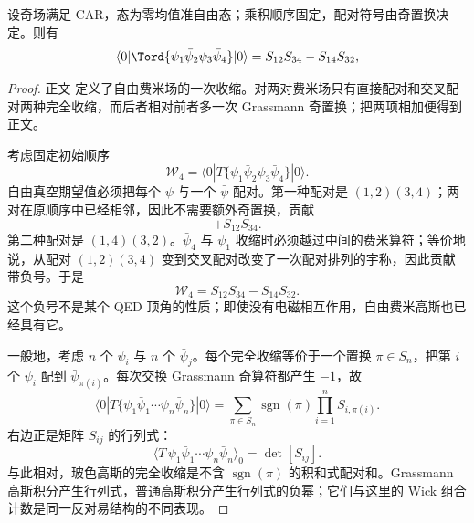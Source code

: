 \begin{proposition}[费米高斯态的四点配对]
设奇场满足 CAR，态为零均值准自由态；乘积顺序固定，配对符号由奇置换决定。则有
\begin{equation}
 {
 \langle0|\Tord\{\psi_1\bar\psi_2\psi_3\bar\psi_4\}|0\rangle
 =S_{12}S_{34}-S_{14}S_{32},}
\label{eq:fermion-wick-four-r68}
\end{equation}
\end{proposition}
\begin{proof}
正文 定义了自由费米场的一次收缩。对两对费米场只有直接配对和交叉配对两种完全收缩，而后者相对前者多一次 Grassmann 奇置换；把两项相加便得到正文。



考虑固定初始顺序
\begin{equation*}
 \mathscr W_4
 =\langle0|T\{\psi_1\bar\psi_2\psi_3\bar\psi_4\}|0\rangle.
\end{equation*}
自由真空期望值必须把每个 $\psi$ 与一个 $\bar\psi$ 配对。第一种配对是 $(1,2)(3,4)$；两对在原顺序中已经相邻，因此不需要额外奇置换，贡献
\begin{equation*}
 +S_{12}S_{34}.
\end{equation*}
第二种配对是 $(1,4)(3,2)$。$\bar\psi_4$ 与 $\psi_1$ 收缩时必须越过中间的费米算符；等价地说，从配对 $(1,2)(3,4)$ 变到交叉配对改变了一次配对排列的宇称，因此贡献带负号。于是
\begin{equation*}
 {
 \mathscr W_4=S_{12}S_{34}-S_{14}S_{32}.}
 \end{equation*}
这个负号不是某个 QED 顶角的性质；即使没有电磁相互作用，自由费米高斯也已经具有它。

一般地，考虑 $n$ 个 $\psi_i$ 与 $n$ 个 $\bar\psi_j$。每个完全收缩等价于一个置换 $\pi\in S_n$，把第 $i$ 个 $\psi_i$ 配到 $\bar\psi_{\pi(i)}$。每次交换 Grassmann 奇算符都产生 $-1$，故
\begin{equation*}
 \langle0|T\{\psi_1\bar\psi_1\cdots\psi_n\bar\psi_n\}|0\rangle
 =\sum_{\pi\in S_n}
 \operatorname{sgn}(\pi)
 \prod_{i=1}^{n}S_{i,\pi(i)}.
 \end{equation*}
右边正是矩阵 $S_{ij}$ 的行列式：
\begin{equation*}
 {
 \langle T\,\psi_1\bar\psi_1\cdots\psi_n\bar\psi_n\rangle_0
 =\det[S_{ij}].}
 \end{equation*}
与此相对，玻色高斯的完全收缩是不含 $\operatorname{sgn}(\pi)$ 的积和式配对和。Grassmann 高斯积分产生行列式，普通高斯积分产生行列式的负幂；它们与这里的 Wick 组合计数是同一反对易结构的不同表现。
\end{proof}

